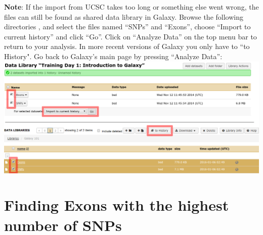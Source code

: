 \documentclass[11pt,a4paper]{article}
\begin{document}
\textbf{Note}: If the import from UCSC takes too long or something else went wrong, the files can still be found as shared data library in Galaxy. Browse the following directories \textit{
\datalibrarydir}
, and select the files named ``SNPs'' and ``Exons'', choose ``Import to current history'' and click ``Go''. Click on ``Analyze Data'' on the top menu bar to return to your analysis. In more recent versions of Galaxy you only have to ``to History". Go back to Galaxy's main page by pressing ``Analyze Data'':
\includegraphics[width=\textwidth]{figures/101_10}\\

\newpage

\section{Finding Exons with the highest number of SNPs}
\end{document}
